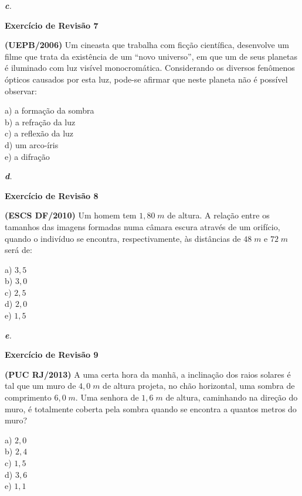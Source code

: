 \documentclass[11pt,twocolumn,oneside]{article}
\newenvironment{resposta*}
  {\bf Resposta:\\ }
  {}
\begin{document}
\begin{resposta*}
{\it \textbf{c}.}
\end{resposta*}

\textbf{Exercício de Revisão 7}


\textbf{(UEPB/2006)} Um cineasta que trabalha com ficção científica, desenvolve um filme que trata da existência de um “novo universo”, em que um de seus planetas é iluminado com luz visível monocromática.  Considerando os diversos fenômenos ópticos causados por esta luz, pode-se afirmar que neste planeta não é possível observar:


a)	a formação da sombra \\
b)	a refração da luz \\
c)	a reflexão da luz \\
d)	um arco-íris \\
e)	a difração


\begin{resposta*}
{\it \textbf{d}.}
\end{resposta*}

\textbf{Exercício de Revisão 8}


\textbf{(ESCS DF/2010)} Um homem tem $1,80\;m$ de altura. A relação entre os tamanhos das imagens formadas numa câmara escura através de um orifício, quando o indivíduo se encontra, respectivamente, às distâncias de $48\;m$ e $72\;m$ será de:


a)	$3,5$ \\
b)	$3,0$ \\
c)	$2,5$ \\
d)	$2,0$ \\
e)	$1,5$


\begin{resposta*}
{\it \textbf{e}.}
\end{resposta*}

\textbf{Exercício de Revisão 9}


\textbf{(PUC RJ/2013)} A uma certa hora da manhã, a inclinação dos raios solares é tal que um muro de $4,0\;m$ de altura projeta, no chão horizontal, uma sombra de comprimento $6,0\;m$. Uma senhora de $1,6\;m$ de altura, caminhando na direção do muro, é totalmente coberta pela sombra quando se encontra a quantos metros do muro?


a)	$2,0$ \\
b)	$2,4$ \\
c)	$1,5$ \\
d)	$3,6$ \\
e)	$1,1$ \\
\end{document}
